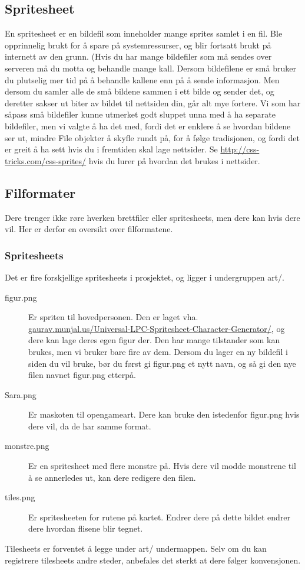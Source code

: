 \documentclass[norsk]{article}
\begin{document}
\subsection{Spritesheet}
\label{subsec:spritesheet}
En spritesheet er en bildefil som inneholder mange sprites samlet i en fil. Ble opprinnelig brukt for å spare på systemressurser, og blir fortsatt brukt på internett av den grunn.
(Hvis du har mange bildefiler som må sendes over serveren må du motta og behandle mange kall. Dersom bildefilene er små bruker du plutselig mer tid på å behandle kallene enn på å sende informasjon.
Men dersom du samler alle de små bildene sammen i ett bilde og sender det, og deretter sakser ut biter av bildet til nettsiden din, går alt mye fortere.
Vi som har såpass små bildefiler kunne utmerket godt sluppet unna med å ha separate bildefiler, men vi valgte å ha det med, fordi det er enklere å se hvordan bildene ser ut, mindre File objekter å skyfle rundt på, for å følge tradisjonen, og fordi det er greit å ha sett hvis du i fremtiden skal lage nettsider.
Se \url{http://css-tricks.com/css-sprites/} hvis du lurer på hvordan det brukes i nettsider.

\subsection{Filformater}
\label{subsec:filformat}
Dere trenger ikke røre hverken brettfiler eller spritesheets, men dere kan hvis dere vil. Her er derfor en oversikt over filformatene.
\subsubsection{Spritesheets}
\label{subsec:spritesheet-file-format}

Det er fire forskjellige spritesheets i prosjektet, og ligger i undergruppen art/.
\begin{description}
\item [figur.png] Er spriten til hovedpersonen. Den er laget vha. \url{gaurav.munjal.us/Universal-LPC-Spritesheet-Character-Generator/}, og dere kan lage deres egen figur der.
  Den har mange tilstander som kan brukes, men vi bruker bare fire av dem.
  Dersom du lager en ny bildefil i siden du vil bruke, bør du først gi figur.png et nytt navn, og så gi den nye filen navnet figur.png etterpå.
\item [Sara.png] Er maskoten til opengameart. Dere kan bruke den istedenfor figur.png hvis dere vil, da de har samme format.
\item [monstre.png] Er en spritesheet med flere monstre på. Hvis dere vil modde monstrene til å se annerledes ut, kan dere redigere den filen.
\item [tiles.png] Er spritesheeten for rutene på kartet. Endrer dere på dette bildet endrer dere hvordan flisene blir tegnet.
\end{description}
Tilesheets er forventet å legge under art/ undermappen. Selv om du kan registrere tilesheets andre steder, anbefales det sterkt at dere følger konvensjonen.
\end{document}
